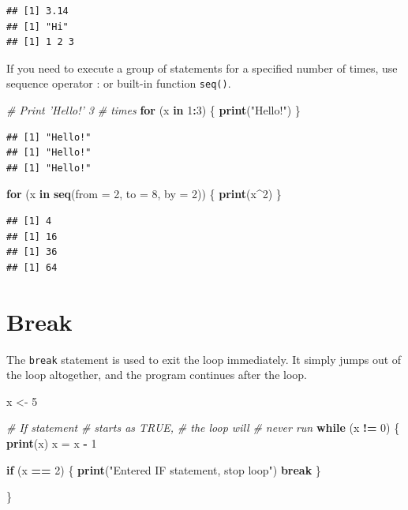 \documentclass[
]{book}
\newenvironment{Shaded}{\begin{snugshade}}{\end{snugshade}}
\newcommand{\CommentTok}[1]{\textcolor[rgb]{0.56,0.35,0.01}{\textit{#1}}}
\newcommand{\ControlFlowTok}[1]{\textcolor[rgb]{0.13,0.29,0.53}{\textbf{#1}}}
\newcommand{\DataTypeTok}[1]{\textcolor[rgb]{0.13,0.29,0.53}{#1}}
\newcommand{\DecValTok}[1]{\textcolor[rgb]{0.00,0.00,0.81}{#1}}
\newcommand{\KeywordTok}[1]{\textcolor[rgb]{0.13,0.29,0.53}{\textbf{#1}}}
\newcommand{\NormalTok}[1]{#1}
\newcommand{\OperatorTok}[1]{\textcolor[rgb]{0.81,0.36,0.00}{\textbf{#1}}}
\newcommand{\StringTok}[1]{\textcolor[rgb]{0.31,0.60,0.02}{#1}}
\begin{document}
\begin{verbatim}
## [1] 3.14
## [1] "Hi"
## [1] 1 2 3
\end{verbatim}

If you need to execute a group of statements for a specified number of times, use sequence operator : or built-in function \texttt{seq()}.

\begin{Shaded}
\begin{Highlighting}[]
\CommentTok{# Print 'Hello!' 3}
\CommentTok{# times}
\ControlFlowTok{for}\NormalTok{ (x }\ControlFlowTok{in} \DecValTok{1}\OperatorTok{:}\DecValTok{3}\NormalTok{) \{}
    \KeywordTok{print}\NormalTok{(}\StringTok{"Hello!"}\NormalTok{)}
\NormalTok{\}}
\end{Highlighting}
\end{Shaded}

\begin{verbatim}
## [1] "Hello!"
## [1] "Hello!"
## [1] "Hello!"
\end{verbatim}

\begin{Shaded}
\begin{Highlighting}[]
\ControlFlowTok{for}\NormalTok{ (x }\ControlFlowTok{in} \KeywordTok{seq}\NormalTok{(}\DataTypeTok{from =} \DecValTok{2}\NormalTok{,}
    \DataTypeTok{to =} \DecValTok{8}\NormalTok{, }\DataTypeTok{by =} \DecValTok{2}\NormalTok{)) \{}
    \KeywordTok{print}\NormalTok{(x}\OperatorTok{^}\DecValTok{2}\NormalTok{)}
\NormalTok{\}}
\end{Highlighting}
\end{Shaded}

\begin{verbatim}
## [1] 4
## [1] 16
## [1] 36
## [1] 64
\end{verbatim}

\hypertarget{break}{%
\section{Break}\label{break}}

The \texttt{break} statement is used to exit the loop immediately. It simply jumps out of the loop altogether, and the program continues after the loop.

\begin{Shaded}
\begin{Highlighting}[]
\NormalTok{x <-}\StringTok{ }\DecValTok{5}

\CommentTok{# If statement}
\CommentTok{# starts as TRUE,}
\CommentTok{# the loop will}
\CommentTok{# never run}
\ControlFlowTok{while}\NormalTok{ (x }\OperatorTok{!=}\StringTok{ }\DecValTok{0}\NormalTok{) \{}
    \KeywordTok{print}\NormalTok{(x)}
\NormalTok{    x =}\StringTok{ }\NormalTok{x }\OperatorTok{-}\StringTok{ }\DecValTok{1}

    \ControlFlowTok{if}\NormalTok{ (x }\OperatorTok{==}\StringTok{ }\DecValTok{2}\NormalTok{) \{}
        \KeywordTok{print}\NormalTok{(}\StringTok{"Entered IF statement, stop loop"}\NormalTok{)}
        \ControlFlowTok{break}
\NormalTok{    \}}

\NormalTok{\}}
\end{Highlighting}
\end{Shaded}
\end{document}
